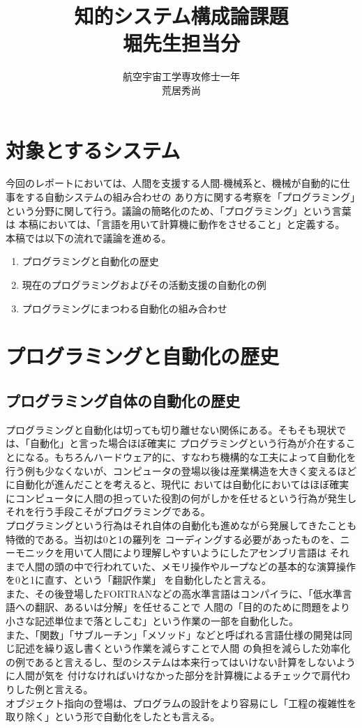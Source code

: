 \documentclass[10pt,a4paper]{ltjsarticle}       %
\title{知的システム構成論課題\\堀先生担当分}
\author{航空宇宙工学専攻修士一年\\荒居秀尚}
\begin{document}
\maketitle

\section{対象とするシステム}
今回のレポートにおいては、人間を支援する人間-機械系と、機械が自動的に仕事をする自動システムの組み合わせの
あり方に関する考察を「プログラミング」という分野に関して行う。議論の簡略化のため、「プログラミング」という言葉は
本稿においては、「言語を用いて計算機に動作をさせること」と定義する。\\

本稿では以下の流れで議論を進める。
\begin{enumerate}
  \item プログラミングと自動化の歴史
  \item 現在のプログラミングおよびその活動支援の自動化の例
  \item プログラミングにまつわる自動化の組み合わせ
\end{enumerate}
\section{プログラミングと自動化の歴史}
\subsection{プログラミング自体の自動化の歴史}
プログラミングと自動化は切っても切り離せない関係にある。そもそも現状では、「自動化」と言った場合ほぼ確実に
プログラミングという行為が介在することになる。もちろんハードウェア的に、すなわち機構的な工夫によって自動化を
行う例も少なくないが、コンピュータの登場以後は産業構造を大きく変えるほどに自動化が進んだことを考えると、現代に
おいては自動化においてはほぼ確実にコンピュータに人間の担っていた役割の何がしかを任せるという行為が発生し
それを行う手段こそがプログラミングである。\\

プログラミングという行為はそれ自体の自動化も進めながら発展してきたことも特徴的である。当初は0と1の羅列を
コーディングする必要があったものを、ニーモニックを用いて人間により理解しやすいようにしたアセンブリ言語は
それまで人間の頭の中で行われていた、メモリ操作やループなどの基本的な演算操作を0と1に直す、という「翻訳作業」
を自動化したと言える。\\
また、その後登場したFORTRANなどの高水準言語はコンパイラに、「低水準言語への翻訳、あるいは分解」を任せることで
人間の「目的のために問題をより小さな記述単位まで落としこむ」という作業の一部を自動化した。\\
また、「関数」「サブルーチン」「メソッド」などと呼ばれる言語仕様の開発は同じ記述を繰り返し書くという作業を減らすことで人間
の負担を減らした効率化の例であると言えるし、型のシステムは本来行ってはいけない計算をしないように人間が気を
付けなければいけなかった部分を計算機によるチェックで肩代わりした例と言える。\\
オブジェクト指向の登場は、プログラムの設計をより容易にし「工程の複雑性を取り除く」という形で自動化をしたとも言える。\\
\end{document}
